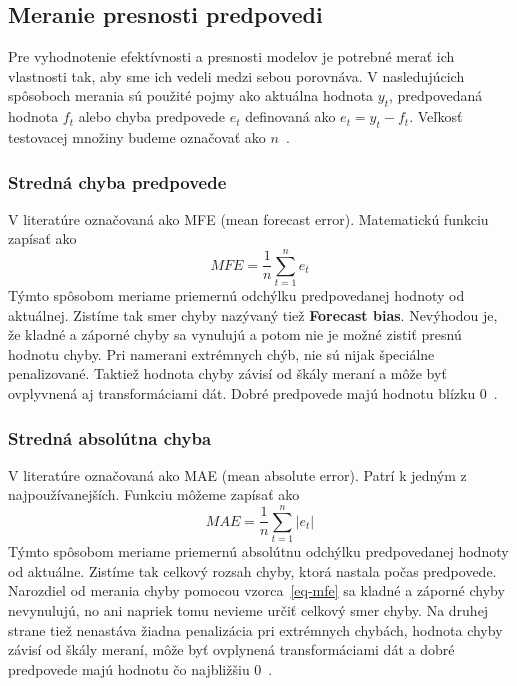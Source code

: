 \documentclass[a4paper,slovak,12pt,appendix]{article}
\begin{document}


\subsection{Meranie presnosti predpovedi}
Pre vyhodnotenie efektívnosti a presnosti modelov je potrebné merať ich
vlastnosti tak, aby sme ich vedeli medzi sebou porovnáva. V nasledujúcich
spôsoboch merania sú použité pojmy ako aktuálna hodnota $y_t$, predpovedaná
hodnota $f_t$ alebo chyba predpovede $e_t$ definovaná ako $e_t = y_t - f_t$.
Veľkosť testovacej množiny budeme označovať ako $n$~\cite{Agrawal2013}.

\subsubsection{Stredná chyba predpovede}
V literatúre označovaná ako MFE (mean forecast error). Matematickú funkciu zapísať ako
\begin{equation}
  MFE = \frac{1}{n} \sum_{t=1}^{n} e_t
  \label{eq-mfe}
\end{equation}
Týmto spôsobom meriame priemernú odchýlku predpovedanej hodnoty od aktuálnej.
Zistíme tak smer chyby nazývaný tiež \textbf{Forecast bias}. Nevýhodou je, že
kladné a záporné chyby sa vynulujú a potom nie je možné zistiť presnú hodnotu
chyby. Pri namerani extrémnych chýb, nie sú nijak špeciálne penalizované.
Taktiež hodnota chyby závisí od škály meraní a môže byť ovplyvnená aj
transformáciami dát. Dobré predpovede majú hodnotu blízku 0~\cite{Agrawal2013}.

\subsubsection{Stredná absolútna chyba}
V literatúre označovaná ako MAE (mean absolute error). Patrí k jedným
z najpoužívanejších. Funkciu môžeme zapísať ako
\begin{equation}
  MAE = \frac{1}{n} \sum_{t=1}^{n} |e_t|
  \label{eq-mae}
\end{equation}
Týmto spôsobom meriame priemernú absolútnu odchýlku predpovedanej hodnoty od
aktuálne. Zistíme tak celkový rozsah chyby, ktorá nastala počas predpovede.
Narozdiel od merania chyby pomocou vzorca~\ref{eq-mfe} sa kladné a záporné
chyby nevynulujú, no ani napriek tomu nevieme určiť celkový smer chyby.
Na druhej strane tiež nenastáva žiadna penalizácia pri extrémnych chybách,
hodnota chyby závisí od škály meraní, môže byť ovplynená transformáciami dát
a dobré predpovede majú hodnotu čo najbližšiu 0~\cite{Agrawal2013, Gutierrez2015}.
\end{document}
